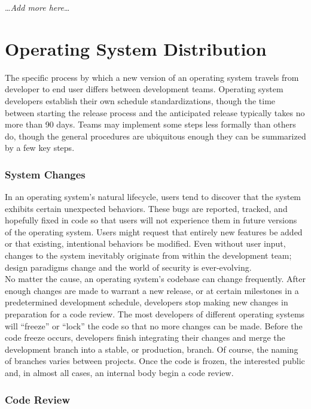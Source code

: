 \documentclass[conference]{IEEEtran}
\begin{document}
\ldots\textit{Add more here}\ldots

\section{Operating System Distribution}

The specific process by which a new version of an operating system
travels from developer to end user differs between development teams.
Operating system developers establish their own schedule
standardizations, though the time between starting the release process
and the anticipated release typically takes no more than 90 days.
Teams may implement some steps less formally than others do,
though the general procedures are ubiquitous enough they can be
summarized by a few key steps.

\subsubsection{System Changes}

In an operating system's natural lifecycle, users tend to discover that
the system exhibits certain unexpected behaviors.
These bugs are reported, tracked, and hopefully fixed in code so that
users will not experience them in future versions of the operating system.
Users might request that entirely new features be added
or that existing, intentional behaviors be modified.
Even without user input, changes to the system inevitably
originate from within the development team; design paradigms change
and the world of security is ever-evolving.\\
\indent No matter the cause, an operating system's codebase can change
frequently. After enough changes are made to warrant a new release,
or at certain milestones in a predetermined development schedule,
developers stop making new changes in preparation for a code review.
The most developers of different operating systems will ``freeze''
or ``lock'' the code so that no more changes can be made.
Before the code freeze occurs, developers finish integrating their changes
and merge the development branch into a stable, or production, branch.
Of course, the naming of branches varies between projects.
Once the code is frozen, the interested public and, in almost all cases,
an internal body begin a code review.

\subsubsection{Code Review}
\end{document}
